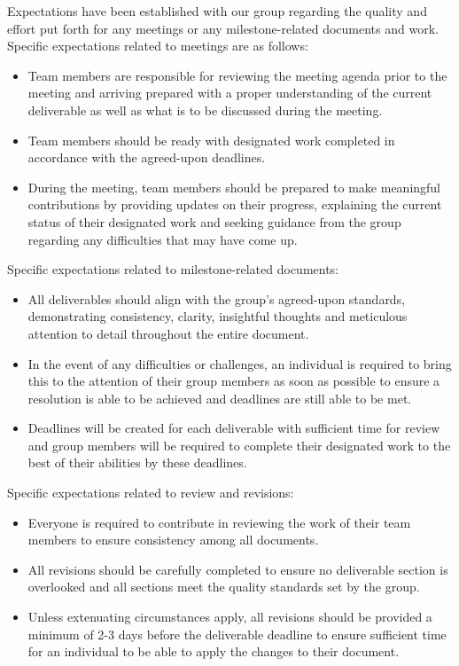 \documentclass{article}
\begin{document}
\iffalse
\wss{What are your team's expectations regarding the quality
of team members' preparation for team meetings and the quality of the
deliverables that members bring to the team?}
\fi

Expectations have been established with our group regarding the quality and effort put forth for any meetings or any
milestone-related documents and work.\\

Specific expectations related to meetings are as follows:
\begin{itemize}
    \item Team members are responsible for reviewing the meeting agenda prior to the meeting and arriving prepared
    with a proper understanding of the current deliverable as well as what is to be discussed during the meeting.
    \item Team members should be ready with designated work completed in accordance with the agreed-upon deadlines.
    \item During the meeting, team members should be prepared to make meaningful contributions by providing updates
    on their progress, explaining the current status of their designated work and seeking guidance from the group
    regarding any  difficulties that may have come up.
\end{itemize}

Specific expectations related to milestone-related documents:
\begin{itemize}
    \item All deliverables should align with the group’s agreed-upon standards, demonstrating consistency, clarity,
    insightful thoughts and meticulous attention to detail throughout the entire document.
    \item In the event of any difficulties or challenges, an individual is required to bring this to the attention
    of their group members as soon as possible to ensure a resolution is able to be achieved and deadlines are still able to be met.
    \item Deadlines will be created for each deliverable with sufficient time for review and group members will be
    required to complete their designated work to the best of their abilities by these deadlines.
\end{itemize}

Specific expectations related to review and revisions:
\begin{itemize}
    \item Everyone is required to contribute in reviewing the work of their team members to ensure consistency among
    all documents.
    \item All revisions should be carefully completed to ensure no deliverable section is overlooked and all
    sections meet the quality standards set by the group.
    \item Unless extenuating circumstances apply, all revisions should be provided a minimum of 2-3 days before the
    deliverable deadline to ensure sufficient time for an individual to be able to apply the changes to their document.
\end{itemize}
\end{document}
